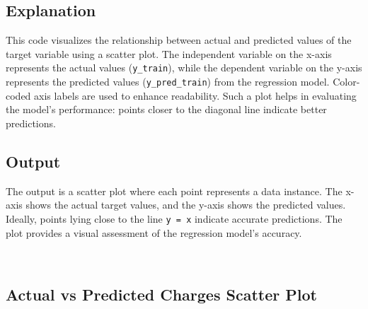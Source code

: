 \documentclass[11pt,a4paper]{report}
\begin{document}
\subsection*{Explanation}
This code visualizes the relationship between actual and predicted values of the target variable using a scatter plot. The independent variable on the x-axis represents the actual values (\texttt{y\_train}), while the dependent variable on the y-axis represents the predicted values (\texttt{y\_pred\_train}) from the regression model. Color-coded axis labels are used to enhance readability. Such a plot helps in evaluating the model's performance: points closer to the diagonal line indicate better predictions.

\subsection*{Output}
The output is a scatter plot where each point represents a data instance. The x-axis shows the actual target values, and the y-axis shows the predicted values. Ideally, points lying close to the line \texttt{y = x} indicate accurate predictions. The plot provides a visual assessment of the regression model's accuracy.
    \begin{center}
    \end{center}
    { \hspace*{\fill} \\}
 
 
 
 \subsection{Actual vs Predicted Charges Scatter Plot}
\end{document}
